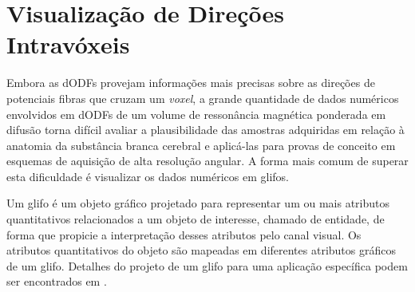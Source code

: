 \documentclass[
    12pt,                %
    oneside,            %
    a4paper,            %
    english,            %
    french,                %
    spanish,            %
    brazil                %
    ]{abntex2}
\begin{document}




\section{Visualização de Direções Intravóxeis}
\label{sec::vis_dODFs}


Embora as dODFs provejam informações mais precisas sobre as direções de potenciais fibras que cruzam um \textit{voxel}, a grande quantidade de dados numéricos envolvidos em dODFs de um volume de ressonância magnética ponderada em difusão torna difícil avaliar a plausibilidade das amostras adquiridas em relação à anatomia da substância branca cerebral e aplicá-las para provas de conceito em esquemas de aquisição de alta resolução angular. A forma mais comum de superar esta dificuldade é visualizar os dados numéricos em glifos. 

Um glifo é um objeto gráfico projetado para representar um ou mais atributos quantitativos relacionados a um objeto de interesse, chamado de entidade, de forma que propicie a interpretação desses atributos pelo canal visual. Os atributos quantitativos do objeto são mapeadas em diferentes atributos gráficos de um glifo. Detalhes do projeto de um glifo para uma aplicação específica podem ser encontrados em .
\end{document}
